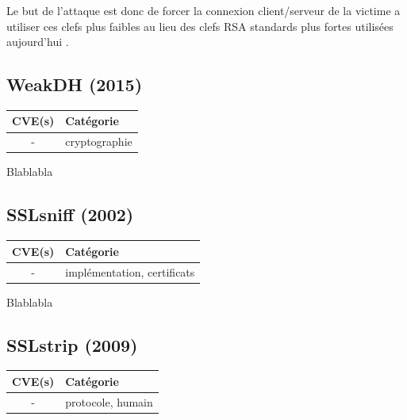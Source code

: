 Le but de l'attaque est donc de forcer la connexion client/serveur de la victime a utiliser ces clefs plus faibles au lieu des clefs RSA standards plus fortes utilisées aujourd'hui \cite{freak}.




\subsection{WeakDH (2015)}

\begin{tabularx}{0.96\textwidth}{|c|X|}
  \hline
  \textbf{CVE(s)} & \textbf{Catégorie} \\
  \hline
  - & cryptographie \\
  \hline
\end{tabularx}

\vspace{1em}

Blablabla \cite{weakdh}




\subsection{SSLsniff (2002)}

\begin{tabularx}{0.96\textwidth}{|c|X|}
  \hline
  \textbf{CVE(s)} & \textbf{Catégorie} \\
  \hline
  - & implémentation, certificats \\
  \hline
\end{tabularx}

\vspace{1em}

Blablabla \cite{sslsniff-website}




\subsection{SSLstrip (2009)}

\begin{tabularx}{0.96\textwidth}{|c|X|}
  \hline
  \textbf{CVE(s)} & \textbf{Catégorie} \\
  \hline
  - & protocole, humain \\
  \hline
\end{tabularx}

